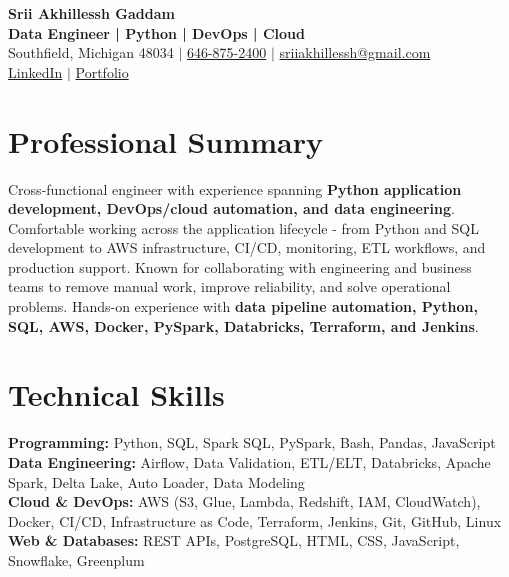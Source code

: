 \documentclass[letterpaper,10pt]{article}
\begin{document}
\fontsize{9.35pt}{10.45pt}\selectfont

\begin{center}
    {\LARGE \textbf{Srii Akhillessh Gaddam}} \\[-1pt]
    \textbf{Data Engineer | Python | DevOps | Cloud} \\[2pt]
    Southfield, Michigan 48034 $|$
    \href{tel:6468752400}{646-875-2400} $|$
    \href{mailto:sriiakhillessh@gmail.com}{sriiakhillessh@gmail.com} \\[1pt]
    \href{https://www.linkedin.com/in/srii-akhiilessh-gaddam-b48668191/}{LinkedIn} $|$
    \href{https://sriiakhillesshg.github.io/portfolio/}{Portfolio}
\end{center}
\vspace{-8pt}

\section{Professional Summary}
\small{Cross-functional engineer with experience spanning \textbf{Python application development, DevOps/cloud automation, and data engineering}. Comfortable working across the application lifecycle - from Python and SQL development to AWS infrastructure, CI/CD, monitoring, ETL workflows, and production support. Known for collaborating with engineering and business teams to remove manual work, improve reliability, and solve operational problems. Hands-on experience with \textbf{data pipeline automation, Python, SQL, AWS, Docker, PySpark, Databricks, Terraform, and Jenkins}.}

\section{Technical Skills}
\small{
\textbf{Programming:} Python, SQL, Spark SQL, PySpark, Bash, Pandas, JavaScript \\
\textbf{Data Engineering:} Airflow, Data Validation, ETL/ELT, Databricks, Apache Spark, Delta Lake, Auto Loader, Data Modeling \\
\textbf{Cloud \& DevOps:} AWS (S3, Glue, Lambda, Redshift, IAM, CloudWatch), Docker, CI/CD, Infrastructure as Code, Terraform, Jenkins, Git, GitHub, Linux \\
\textbf{Web \& Databases:} REST APIs, PostgreSQL, HTML, CSS, JavaScript, Snowflake, Greenplum
}
\end{document}
